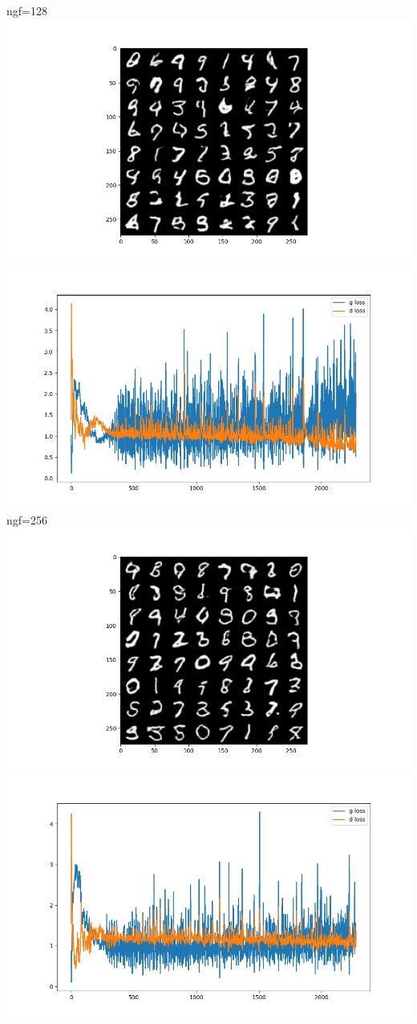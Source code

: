 ngf=128
\includegraphics{./images/Pasted image 20231228113921.png}\includegraphics{./images/Pasted image 20231228113936.png}
ngf=256
\includegraphics{./images/Pasted image 20231228114012.png}\includegraphics{./images/Pasted image 20231228114031.png}


